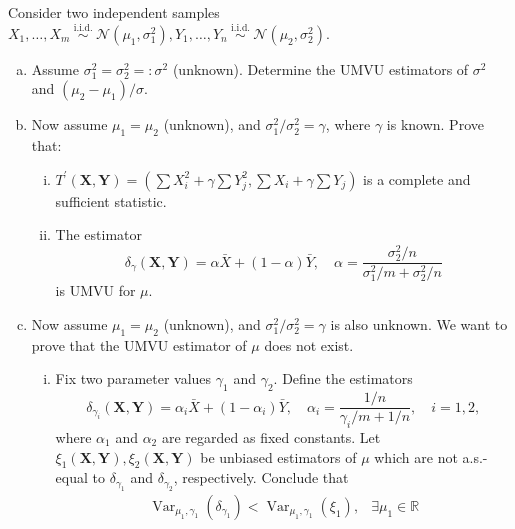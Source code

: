 \begin{ex}
    Consider two independent samples \(X_{1}, \ldots, X_{m} \stackrel{\text { i.i.d. }}{\sim} \mathcal{N}\left(\mu_{1}, \sigma_{1}^{2}\right), Y_{1}, \ldots, Y_{n} \stackrel{\text { i.i.d. }}{\sim} \mathcal{N}\left(\mu_{2}, \sigma_{2}^{2}\right)\). 
    \begin{enumerate}[(a)]
        \item Assume \(\sigma_{1}^{2}=\sigma_{2}^{2}=: \sigma^{2}\) (unknown). Determine the UMVU estimators of \(\sigma^{2}\) and \(\left(\mu_{2}-\mu_{1}\right) / \sigma\). 
        \item Now assume \(\mu_{1}=\mu_{2}\) (unknown), and \(\sigma_{1}^{2} / \sigma_{2}^{2}=\gamma\), where \(\gamma\) is known. Prove that: 
        \begin{enumerate}[(i)]
            \item \(T^{\prime}(\mathbf{X}, \mathbf{Y})=\left(\sum X_{i}^{2}+\gamma \sum Y_{j}^{2}, \sum X_{i}+\gamma \sum Y_{j}\right)\) is a complete and sufficient statistic. 
            \item The estimator
            \[
                \delta_{\gamma}(\mathbf{X}, \mathbf{Y})=\alpha \bar{X}+(1-\alpha) \bar{Y}, \quad \alpha=\frac{\sigma_{2}^{2} / n}{\sigma_{1}^{2} / m+\sigma_{2}^{2} / n}
            \]
            is UMVU for \(\mu\). 
        \end{enumerate}
        \item Now assume \(\mu_{1}=\mu_{2}\) (unknown), and \(\sigma_{1}^{2} / \sigma_{2}^{2}=\gamma\) is also unknown. We want to prove that the UMVU estimator of \(\mu\) does not exist. 
        \begin{enumerate}[(i)]
            \item Fix two parameter values \(\gamma_{1}\) and \(\gamma_{2}\). Define the estimators
            \[
            \delta_{\gamma_{i}}(\mathbf{X}, \mathbf{Y})=\alpha_{i} \bar{X}+\left(1-\alpha_{i}\right) \bar{Y}, \quad \alpha_{i}=\frac{1 / n}{\gamma_{i} / m+1 / n}, \quad i=1,2,
            \]
            where \(\alpha_{1}\) and \(\alpha_{2}\) are regarded as fixed constants. Let \(\xi_{1}(\mathbf{X}, \mathbf{Y}), \xi_{2}(\mathbf{X}, \mathbf{Y})\) be unbiased estimators of \(\mu\) which are not a.s.-equal to \(\delta_{\gamma_{1}}\) and \(\delta_{\gamma_{2}}\), respectively. Conclude that
            \[
            \begin{array}{ll}
            \operatorname{Var}_{\mu_{1}, \gamma_{1}}\left(\delta_{\gamma_{1}}\right)<\operatorname{Var}_{\mu_{1}, \gamma_{1}}\left(\xi_{1}\right), & \exists \mu_{1} \in \mathbb{R} \\

\end{array}\]
\end{enumerate}
\end{enumerate}
\end{ex}
